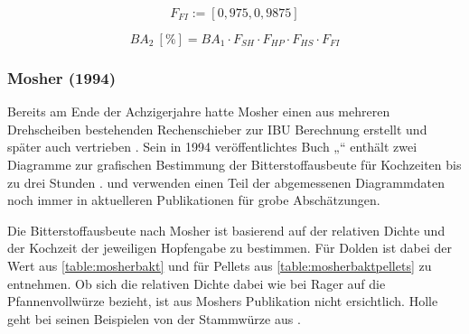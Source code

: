 \documentclass[a4paper,parskip=half]{scrartcl}
\newcommand{\BA}{\mathit{BA}}
\newcommand{\uper}{\:[\text{\%}]}
\newcommand{\FAH}{F_{\mathit{SH}}}
\newcommand{\FHF}{F_{\mathit{HP}}}
\newcommand{\FHS}{F_{\mathit{HS}}}
\newcommand{\FFil}{F_{\mathit{FI}}}
\begin{document}
\begin{equation}
\FFil := \left[0,975, 0,9875 \right]
\label{eq:garetzfil}
\end{equation}

\begin{equation}
\BA_2 \uper = BA_1 \cdot \FAH \cdot \FHF \cdot \FHS \cdot \FFil
\label{eq:garetzba2}
\end{equation}

\subsubsection*{Mosher (1994)}

Bereits am Ende der Achzigerjahre hatte Mosher einen aus mehreren Drehscheiben bestehenden Rechenschieber zur IBU Berechnung erstellt und später auch vertrieben \parencite{Mosher2022}. Sein in 1994 veröffentlichtes Buch „“ enthält zwei Diagramme zur grafischen Bestimmung der Bitterstoffausbeute für Kochzeiten bis zu drei Stunden \parencite[160\psq]{Mosher1994}. \textcite{Holle2010} und \textcite{Thesseling2019} verwenden einen Teil der abgemessenen Diagrammdaten noch immer in aktuelleren Publikationen für grobe Abschätzungen.

Die Bitterstoffausbeute nach Mosher ist basierend auf der relativen Dichte und der Kochzeit der jeweiligen Hopfengabe zu bestimmen. Für Dolden ist dabei der Wert aus \autoref{table:mosherbakt} und für Pellets aus \autoref{table:mosherbaktpellets} zu entnehmen. Ob sich die relativen Dichte dabei wie bei Rager auf die Pfannenvollwürze bezieht, ist aus Moshers Publikation nicht ersichtlich. Holle geht bei seinen Beispielen von der Stammwürze aus \parencite[53]{Holle2010}.
\end{document}
